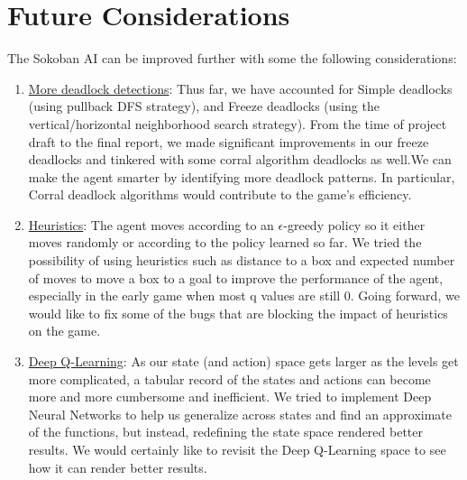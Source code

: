 \documentclass{article}
\begin{document}
\section{Future Considerations}
The Sokoban AI can be improved further with some the following considerations:
\begin{enumerate}
    \item \underline{More deadlock detections}: Thus far, we have accounted for Simple deadlocks (using pullback DFS strategy), and Freeze deadlocks (using the vertical/horizontal neighborhood search strategy). From the time of project draft to the final report, we made significant improvements in our freeze deadlocks and tinkered with some corral algorithm deadlocks as well.We can make the agent smarter by identifying more deadlock patterns. In particular, Corral deadlock algorithms would contribute to the game's efficiency.
    \item \underline{Heuristics}: The agent moves according to an $\epsilon$-greedy policy so it either moves randomly or according to the policy learned so far. We tried the possibility of using heuristics such as distance to a box and expected number of moves to move a box to a goal to improve the performance of the agent, especially in the early game when most q values are still $0$. Going forward, we would like to fix some of the bugs that are blocking the impact of heuristics on the game. 
    \item \underline{Deep Q-Learning}: As our state (and action) space gets larger as the levels get more complicated, a tabular record of the states and actions can become more and more cumbersome and inefficient. We tried to implement Deep Neural Networks to help us generalize across states and find an approximate of the functions, but instead, redefining the state space rendered better results. We would certainly like to revisit the Deep Q-Learning space to see how it can render better results. 

\end{enumerate}
\end{document}
